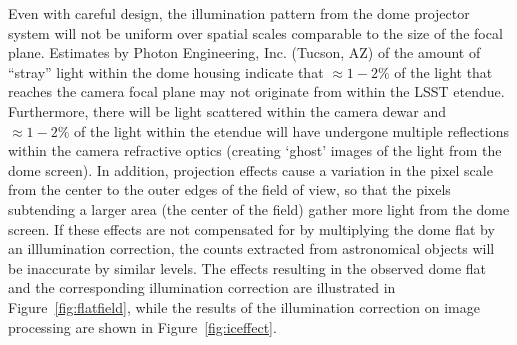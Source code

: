 \documentclass[12pt,preprint]{aastex}
\begin{document}
Even with careful design, the illumination pattern from the dome
projector system will not be uniform over spatial scales comparable to
the size of the focal plane. Estimates by Photon Engineering,
Inc. (Tucson, AZ) of the amount of ``stray'' light within the dome
housing indicate that $\approx 1−2\%$ of the light that reaches the
camera focal plane may not originate from within the LSST etendue.
Furthermore, there will be light scattered within the camera dewar and
$\approx 1-2\%$ of the light within the etendue will have undergone
multiple reflections within the camera refractive optics (creating
`ghost' images of the light from the dome screen). In addition,
projection effects cause a variation in the pixel scale from the
center to the outer edges of the field of view, so that the pixels
subtending a larger area (the center of the field) gather more light
from the dome screen. If these effects are not compensated for by
multiplying the dome flat by an illlumination correction, the counts
extracted from astronomical objects will be inaccurate by similar
levels. The effects resulting in the observed dome flat and the
corresponding illumination correction are illustrated in
Figure~\ref{fig:flatfield}, while the results of the illumination
correction on image processing are shown in
Figure~\ref{fig:iceffect}. 
\end{document}

